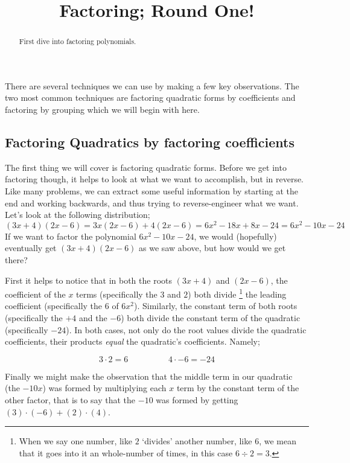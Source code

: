 \documentclass{ximeraXloud}
\title{Factoring; Round One!}
\begin{document}
\begin{abstract}
    First dive into factoring polynomials.
\end{abstract}
\maketitle

There are several techniques we can use by making a few key observations. The two most common techniques are factoring quadratic forms by coefficients and factoring by grouping which we will begin with here.

\subsection{Factoring Quadratics by factoring coefficients}
    The first thing we will cover is factoring quadratic forms. Before we get into factoring though, it helps to look at what we want to accomplish, but in reverse. Like many problems, we can extract some useful information by starting at the end and working backwards, and thus trying to reverse-engineer what we want. Let's look at the following distribution;
    \[
        (3x + 4)(2x - 6) = 3x(2x - 6) + 4(2x - 6) = 6x^2 -18x + 8x - 24 = 6x^2 - 10x - 24
    \]
    If we want to factor the polynomial $6x^2 - 10x - 24$, we would (hopefully) eventually get $(3x + 4)(2x - 6)$ as we saw above, but how would we get there?
    
    First it helps to notice that in both the roots $(3x + 4)$ and $(2x - 6)$, the coefficient of the $x$ terms (specifically the $3$ and $2$) both divide%
    \footnote{%
        When we say one number, like $2$ `divides' another number, like $6$, we mean that it goes into it an whole-number of times, in this case $6 \div 2 = 3$.%
        }
    the leading coefficient (specifically the $6$ of $6x^2$). Similarly, the constant term of both roots (specifically the $+4$ and the $-6$) both divide the constant term of the quadratic (specifically $-24$). In both cases, not only do the root values divide the quadratic coefficients, their products \textit{equal} the quadratic's coefficients. Namely;
    
    \[
        3 \cdot 2 = 6 \hspace{2cm} 4 \cdot -6 = -24
    \]
    
    Finally we might make the observation that the middle term in our quadratic (the $-10x$) was formed by multiplying each $x$ term by the constant term of the other factor, that is to say that the $-10$ was formed by getting $(3) \cdot (-6) + (2) \cdot (4)$.
    
\end{document}
